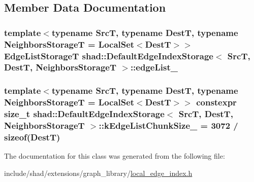 \subsection{Member Data Documentation}
\hypertarget{classshad_1_1DefaultEdgeIndexStorage_aa6583a96819d8920897b7a5f4581f849}{
\subsubsection[{edge\-List\-\_\-}]{\setlength{\rightskip}{0pt plus 5cm}template$<$typename Src\-T, typename Dest\-T, typename Neighbors\-Storage\-T = Local\-Set$<$\-Dest\-T$>$$>$ {\bf Edge\-List\-Storage\-T} {\bf shad\-::\-Default\-Edge\-Index\-Storage}$<$ Src\-T, Dest\-T, Neighbors\-Storage\-T $>$\-::edge\-List\-\_\-}}\label{classshad_1_1DefaultEdgeIndexStorage_aa6583a96819d8920897b7a5f4581f849}
\hypertarget{classshad_1_1DefaultEdgeIndexStorage_aae9f28f3799a6a274b0249dc1dc4313c}{
\subsubsection[{k\-Edge\-List\-Chunk\-Size\-\_\-}]{\setlength{\rightskip}{0pt plus 5cm}template$<$typename Src\-T, typename Dest\-T, typename Neighbors\-Storage\-T = Local\-Set$<$\-Dest\-T$>$$>$ constexpr size\-\_\-t {\bf shad\-::\-Default\-Edge\-Index\-Storage}$<$ Src\-T, Dest\-T, Neighbors\-Storage\-T $>$\-::k\-Edge\-List\-Chunk\-Size\-\_\- = 3072 / sizeof(Dest\-T)\hspace{0.3cm}{\ttfamily [static]}}}\label{classshad_1_1DefaultEdgeIndexStorage_aae9f28f3799a6a274b0249dc1dc4313c}


The documentation for this class was generated from the following file\-:\begin{DoxyCompactItemize}
\item 
include/shad/extensions/graph\-\_\-library/\hyperlink{local__edge__index_8h}{local\-\_\-edge\-\_\-index.\-h}\end{DoxyCompactItemize}
